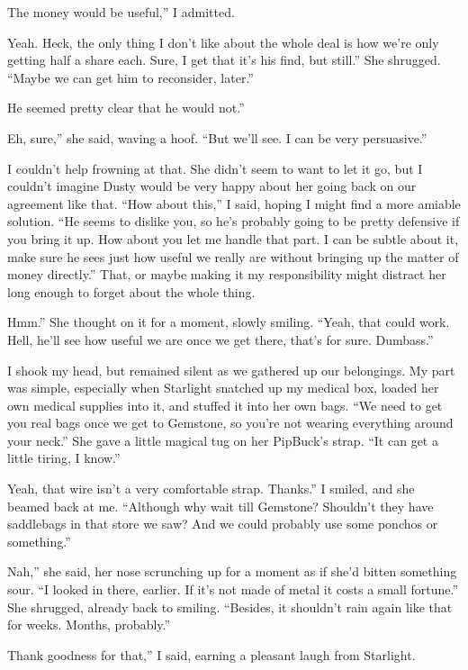 \leavevmode{}The money would be useful,” I admitted.

\leavevmode{}Yeah. Heck, the only thing I don’t like about the whole deal is how we’re only getting half a share each. Sure, I get that it’s his find, but still.” She shrugged. “Maybe we can get him to reconsider, later.”

\leavevmode{}He seemed pretty clear that he would not.”

\leavevmode{}Eh, sure,” she said, waving a hoof. “But we’ll see. I can be very persuasive.”

I couldn’t help frowning at that. She didn’t seem to want to let it go, but I couldn’t imagine Dusty would be very happy about her going back on our agreement like that. “How about this,” I said, hoping I might find a more amiable solution. “He seems to dislike you, so he’s probably going to be pretty defensive if you bring it up. How about you let me handle that part. I can be subtle about it, make sure he sees just how useful we really are without bringing up the matter of money directly.” That, or maybe making it my responsibility might distract her long enough to forget about the whole thing.

\leavevmode{}Hmm.” She thought on it for a moment, slowly smiling. “Yeah, that could work. Hell, he’ll see how useful we are once we get there, that’s for sure. Dumbass.”

I shook my head, but remained silent as we gathered up our belongings. My part was simple, especially when Starlight snatched up my medical box, loaded her own medical supplies into it, and stuffed it into her own bags. “We need to get you real bags once we get to Gemstone, so you’re not wearing everything around your neck.” She gave a little magical tug on her PipBuck’s strap. “It can get a little tiring, I know.”

\leavevmode{}Yeah, that wire isn’t a very comfortable strap. Thanks.” I smiled, and she beamed back at me. “Although why wait till Gemstone? Shouldn’t they have saddlebags in that store we saw? And we could probably use some ponchos or something.”

\leavevmode{}Nah,” she said, her nose scrunching up for a moment as if she’d bitten something sour. “I looked in there, earlier. If it’s not made of metal it costs a small fortune.” She shrugged, already back to smiling. “Besides, it shouldn’t rain again like that for weeks. Months, probably.”

\leavevmode{}Thank goodness for that,” I said, earning a pleasant laugh from Starlight.

